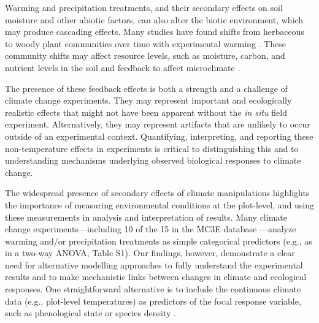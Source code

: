 \documentclass{article}
\begin{document}
\par Warming and precipitation treatments, and their secondary effects on soil moisture and other abiotic factors, can also alter the biotic environment, which may produce cascading effects. Many studies have found shifts from herbaceous to woody plant communities over time with experimental warming \citep[e.g.,][]{rollinson2012, mcdaniel2014,mcdaniel2014b, harte2015}. These community shifts may affect resource levels, such as moisture, carbon, and nutrient levels in the soil \citep{mcdaniel2014,mcdaniel2014b, harte2015} and feedback to affect microclimate \citep{harte2015}. 
\par The presence of these feedback effects is both a strength and a challenge of climate change experiments. They may represent important and ecologically realistic effects that might not have been apparent without the \emph{in situ} field experiment. Alternatively, they may represent artifacts that are unlikely to occur outside of an experimental context. Quantifying, interpreting, and reporting these non-temperature effects in experiments is critical to distinguishing this and to understanding mechanisms underlying observed biological responses to climate change. 

\par The widespread presence of secondary effects of climate manipulations highlights the importance of measuring environmental conditions at the plot-level, and using these measurements in analysis and interpretation of results. Many climate change experiments---including 10 of the 15 in the MC3E database
---analyze warming and/or precipitation treatments as simple categorical predictors (e.g., as in a two-way ANOVA, Table S1). Our findings, however, demonstrate a clear need for alternative modelling approaches to fully understand the experimental results and to make mechanistic links between changes in climate and ecological responses. One straightforward alternative is to include the continuous climate data (e.g., plot-level temperatures) as predictors of the focal response variable, such as phenological state or species density \citep [e.g.,][]{marchin2015, pelini2014}.%
\end{document}
